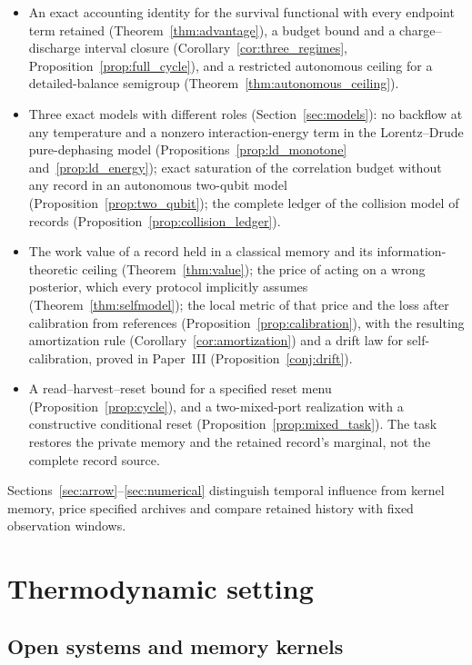 \documentclass[12pt]{article}
\begin{document}
\begin{itemize}
\item An exact accounting identity for the survival functional with every endpoint term retained (Theorem~\ref{thm:advantage}), a budget bound and a charge--discharge interval closure (Corollary~\ref{cor:three_regimes}, Proposition~\ref{prop:full_cycle}), and a restricted autonomous ceiling for a detailed-balance semigroup (Theorem~\ref{thm:autonomous_ceiling}).
\item Three exact models with different roles (Section~\ref{sec:models}): no backflow at any temperature and a nonzero interaction-energy term in the Lorentz--Drude pure-dephasing model (Propositions~\ref{prop:ld_monotone} and~\ref{prop:ld_energy}); exact saturation of the correlation budget without any record in an autonomous two-qubit model (Proposition~\ref{prop:two_qubit}); the complete ledger of the collision model of records (Proposition~\ref{prop:collision_ledger}).
\item The work value of a record held in a classical memory and its information-theoretic ceiling (Theorem~\ref{thm:value}); the price of acting on a wrong posterior, which every protocol implicitly assumes (Theorem~\ref{thm:selfmodel}); the local metric of that price and the loss after calibration from references (Proposition~\ref{prop:calibration}), with the resulting amortization rule (Corollary~\ref{cor:amortization}) and a drift law for self-calibration, proved in Paper~III (Proposition~\ref{conj:drift}).
\item A read--harvest--reset bound for a specified reset menu (Proposition~\ref{prop:cycle}), and a two-mixed-port realization with a constructive conditional reset (Proposition~\ref{prop:mixed_task}). The task restores the private memory and the retained record's marginal, not the complete record source.
\end{itemize}
Sections~\ref{sec:arrow}--\ref{sec:numerical} distinguish temporal influence from kernel memory, price specified archives and compare retained history with fixed observation windows.

\section{Thermodynamic setting}
\label{sec:prelim}

\subsection{Open systems and memory kernels}
\end{document}
